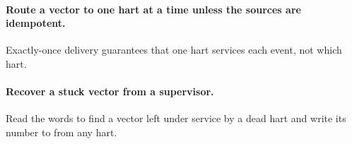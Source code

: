 \paragraph{Route a vector to one hart at a time unless the sources are idempotent.} Exactly-once delivery guarantees that one hart services each event, not which hart.

\paragraph{Recover a stuck vector from a supervisor.} Read the  words to find a vector left under service by a dead hart and write its number to  from any hart.
